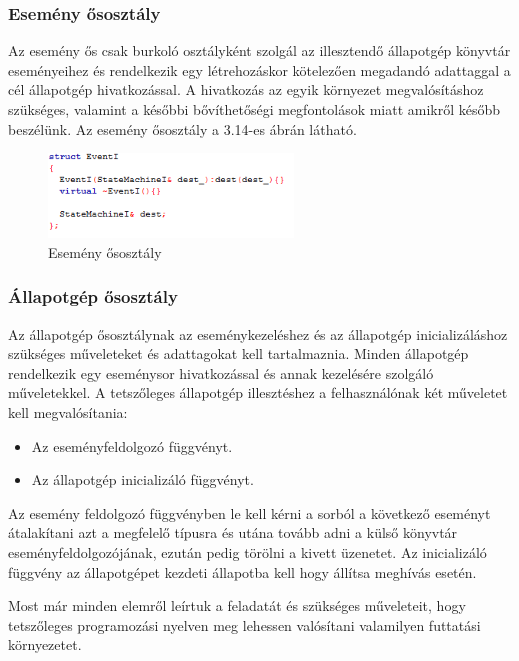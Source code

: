 \documentclass[a4paper,12pt]{report}
\begin{document}
\subsubsection{Esemény ősosztály}

Az esemény ős csak burkoló osztályként szolgál az illesztendő állapotgép könyvtár eseményeihez és rendelkezik egy létrehozáskor kötelezően megadandó adattaggal a cél állapotgép hivatkozással. A hivatkozás az egyik környezet megvalósításhoz szükséges, valamint a későbbi bővíthetőségi megfontolások miatt amikről később beszélünk. Az esemény ősosztály a 3.14-es ábrán látható.

\begin{figure}[hbtp]
\centering
\includegraphics[width=0.58\textwidth]{eventi.png}
\caption{Esemény ősosztály}
\label{fig:esnit}
\end{figure}

\subsubsection{Állapotgép ősosztály}

Az állapotgép ősosztálynak az eseménykezeléshez és az állapotgép inicializáláshoz szükséges műveleteket és adattagokat kell tartalmaznia. Minden állapotgép rendelkezik egy eseménysor hivatkozással és annak kezelésére szolgáló műveletekkel. A tetszőleges állapotgép illesztéshez a felhasználónak két műveletet kell megvalósítania:
\begin{itemize}
\item Az eseményfeldolgozó függvényt.
\item Az állapotgép inicializáló függvényt.
\end{itemize}
Az esemény feldolgozó függvényben le kell kérni a sorból a következő eseményt átalakítani azt a megfelelő típusra és utána tovább adni a külső könyvtár eseményfeldolgozójának, ezután pedig törölni a kivett üzenetet. Az inicializáló függvény az állapotgépet kezdeti állapotba kell hogy állítsa meghívás esetén. 

Most már minden elemről leírtuk a feladatát és szükséges műveleteit, hogy tetszőleges programozási nyelven meg lehessen valósítani valamilyen futtatási környezetet.
\end{document}
